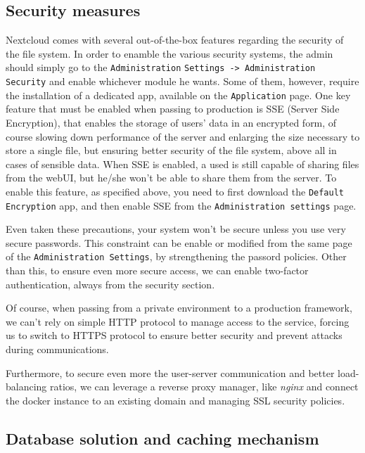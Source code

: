 \documentclass{article}
\begin{document}
	\subsection{Security measures}
	Nextcloud comes with several out-of-the-box features regarding the security of the file system. In order to enamble the various security systems, the admin should simply go to the \verb|Administration| \verb|Settings -> Administration Security| and enable whichever module he wants. Some of them, however, require the installation of a dedicated app, available on the \verb|Application| page. One key feature that must be enabled when passing to production is SSE (Server Side Encryption), that enables the storage of users' data in an encrypted form, of course slowing down performance of the server and enlarging the size necessary to store a single file, but ensuring better security of the file system, above all in cases of sensible data. When SSE is enabled, a used is still capable of sharing files from the webUI, but he/she won't be able to share them from the server.
	To enable this feature, as specified above, you need to first download the \verb|Default Encryption| app, and then enable SSE from the \verb|Administration settings| page.
	
	Even taken these precautions, your system won't be secure unless you use very secure passwords. This constraint can be enable or modified from the same page of the \verb|Administration Settings|, by strengthening the passord policies. Other than this, to ensure even more secure access, we can enable two-factor authentication, always from the security section.
	
	
	Of course, when passing from a private environment to a production framework, we can't rely on simple HTTP protocol to manage access to the service, forcing us to switch to HTTPS protocol to ensure better security and prevent attacks during communications.
	
	Furthermore, to secure even more the user-server communication and better load-balancing ratios, we can leverage a reverse proxy manager, like \textit{nginx} and connect the docker instance to an existing domain and managing SSL security policies.
		
	\subsection{Database solution and caching mechanism}
	
\end{document}
